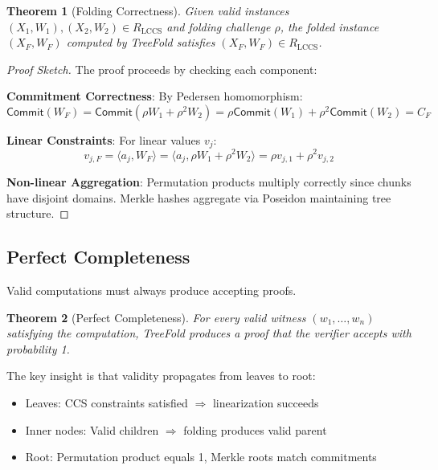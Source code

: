 \documentclass[11pt,a4paper]{article}
\theoremstyle{plain}
\newtheorem{theorem}{Theorem}[section]
\theoremstyle{definition}
\newcommand{\Com}{\mathsf{Commit}}
\begin{document}
\begin{theorem}[Folding Correctness]
Given valid instances $(X_1, W_1), (X_2, W_2) \in R_{\text{LCCS}}$ and folding challenge $\rho$, the folded instance $(X_F, W_F)$ computed by TreeFold satisfies $(X_F, W_F) \in R_{\text{LCCS}}$.
\end{theorem}

\begin{proof}[Proof Sketch]
The proof proceeds by checking each component:

\textbf{Commitment Correctness}: By Pedersen homomorphism:
\begin{equation}
\Com(W_F) = \Com(\rho W_1 + \rho^2 W_2) = \rho \Com(W_1) + \rho^2 \Com(W_2) = C_F
\end{equation}

\textbf{Linear Constraints}: For linear values $v_j$:
\begin{equation}
v_{j,F} = \langle a_j, W_F \rangle = \langle a_j, \rho W_1 + \rho^2 W_2 \rangle = \rho v_{j,1} + \rho^2 v_{j,2}
\end{equation}

\textbf{Non-linear Aggregation}: Permutation products multiply correctly since chunks have disjoint domains. Merkle hashes aggregate via Poseidon maintaining tree structure.
\end{proof}

\subsection{Perfect Completeness}

Valid computations must always produce accepting proofs.

\begin{theorem}[Perfect Completeness]
For every valid witness $(w_1, \ldots, w_n)$ satisfying the computation, TreeFold produces a proof that the verifier accepts with probability 1.
\end{theorem}

The key insight is that validity propagates from leaves to root:
\begin{itemize}
\item Leaves: CCS constraints satisfied $\Rightarrow$ linearization succeeds
\item Inner nodes: Valid children $\Rightarrow$ folding produces valid parent
\item Root: Permutation product equals 1, Merkle roots match commitments
\end{itemize}
\end{document}
